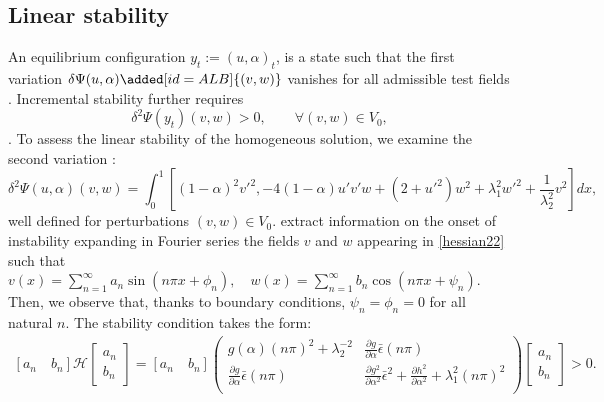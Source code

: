 

\subsection{Linear stability}
An equilibrium configuration $y_t:=(u,\alpha)_t$, is a state such that the first variation $\delta \Psi(u,\alpha)\added[id=ALB]{(v, w)}$ vanishes for all admissible test fields  . Incremental stability further requires
\begin{equation}
\delta^2 \Psi(y_t)(v,w)>0, \qquad  \forall (v,w)\in V_0,
\label{eqn:linear_second_order_stability}
\end{equation}
. 
To assess the linear stability of the homogeneous solution, we examine the  second variation  :
\begin{equation}
\delta^2 \Psi(u,\alpha)(v,w)=\int_0^1 [(1-\alpha)^2v'^2 ,
- 4(1-\alpha)u' v'w+(2+ u'^2)w^2+\lambda_1^2w'^2 +\frac{1}{\lambda_2^2} v^2 ]dx,
\label{hessian22}
\end{equation}
well defined for perturbations $(v, w)\in V_0$.
 extract information on the onset of instability expanding in Fourier series the fields $v$ and $w$ appearing in \eqref{hessian22} such that $v(x)=\sum_{n=1}^{\infty} a_{n} \sin \left(n \pi x+\phi_{n}\right), \quad w(x)=\sum_{n=1}^{\infty} b_{n} \cos \left(n \pi x+\psi_{n}\right)$. Then, we observe that, thanks to boundary conditions, $\psi_{n}=\phi_{n}=0$ for all natural $n$. The stability condition  takes the form:
\begin{align}\left[ a_n \quad b_n \right] \mathcal{H} \left[ \begin{array}{c} a_n \\ b_n \end{array} \right]=\left[ a_n \quad b_n \right]\left(
\begin{array}{cc}
g(\alpha)(n\pi)^2+\lambda_2^{-2}  & \frac{\partial g}{\partial \alpha}\bar\epsilon(n\pi)  \\
\frac{\partial g}{\partial \alpha}\bar\epsilon(n\pi)  &   \frac{\partial g^2}{\partial \alpha^2}\bar\epsilon^2+ \frac{\partial h^2}{\partial \alpha^2}+\lambda_1^2(n\pi)^2  \\
\end{array}
\right)\left[ \begin{array}{c} a_n \\ b_n \end{array} \right]>0.\label{hessian1}\end{align}
